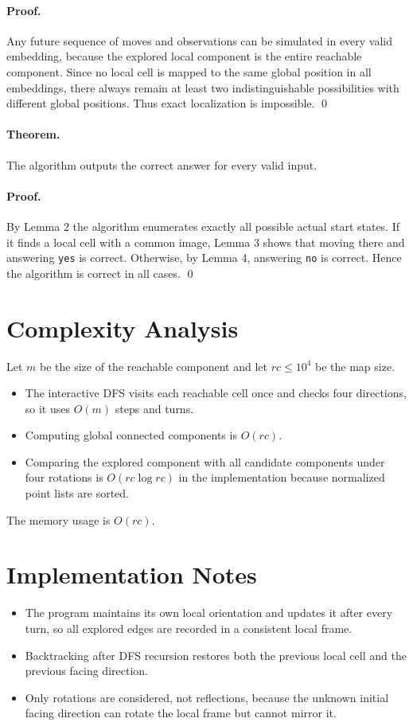 \documentclass[11pt]{article}
\begin{document}
\paragraph{Proof.}
Any future sequence of moves and observations can be simulated in every valid embedding, because the explored local component is the entire reachable component. Since no local cell is mapped to the same global position in all embeddings, there always remain at least two indistinguishable possibilities with different global positions. Thus exact localization is impossible. \qed

\paragraph{Theorem.}
The algorithm outputs the correct answer for every valid input.

\paragraph{Proof.}
By Lemma 2 the algorithm enumerates exactly all possible actual start states. If it finds a local cell with a common image, Lemma 3 shows that moving there and answering \texttt{yes} is correct. Otherwise, by Lemma 4, answering \texttt{no} is correct. Hence the algorithm is correct in all cases. \qed

\section*{Complexity Analysis}

Let $m$ be the size of the reachable component and let $rc \le 10^4$ be the map size.

\begin{itemize}[leftmargin=*]
    \item The interactive DFS visits each reachable cell once and checks four directions, so it uses $O(m)$ steps and turns.
    \item Computing global connected components is $O(rc)$.
    \item Comparing the explored component with all candidate components under four rotations is $O(rc \log rc)$ in the implementation because normalized point lists are sorted.
\end{itemize}

The memory usage is $O(rc)$.

\section*{Implementation Notes}

\begin{itemize}[leftmargin=*]
    \item The program maintains its own local orientation and updates it after every turn, so all explored edges are recorded in a consistent local frame.
    \item Backtracking after DFS recursion restores both the previous local cell and the previous facing direction.
    \item Only rotations are considered, not reflections, because the unknown initial facing direction can rotate the local frame but cannot mirror it.
\end{itemize}
\end{document}
